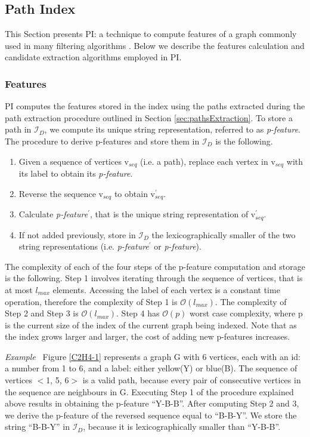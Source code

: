 \documentclass{l4proj}
\newcounter{example}[section]
\newenvironment{example}[1][]{\refstepcounter{example}\par\medskip
   \noindent \textit{Example~\theexample #1} \rmfamily}{\medskip}
\newcommand{\fancyI}{\mathcal{I}}
\begin{document}
\subsection{Path Index}
\label{sec:pi}
This Section presents PI: a technique to compute features of a graph commonly used in many filtering algorithms \cite{graphgrepsx}. Below we describe the features calculation and candidate extraction algorithms employed in PI.

\subsubsection{Features}
\label{sec:pifeatures}
PI computes the features stored in the index using the paths extracted during the path extraction procedure outlined in Section \ref{sec:pathsExtraction}. To store a path in $\fancyI_{D}$, we compute its unique string representation, referred to as \emph{p-feature}. The procedure to derive p-features and store them in $\fancyI_{D}$ is the following.
\begin{enumerate}
\item Given a sequence of vertices v$_{seq}$ (i.e. a path), replace each vertex in v$_{seq}$ with its label to obtain its \emph{p-feature}.
\item Reverse the sequence v$_{seq}$ to obtain v$_{seq}^{\prime}$.
\item Calculate \emph{p-feature}$^{\prime}$, that is the unique string representation of v$_{seq}^{\prime}$.
\item If not added previously, store in $\fancyI_{D}$ the lexicographically smaller of the two string representations (i.e. \emph{p-feature}$^{\prime}$ or \emph{p-feature}).
\end{enumerate}

The complexity of each of the four steps of the p-feature computation and storage is the following. Step 1 involves iterating through the sequence of vertices, that is at most $l_{max}$ elements. Accessing the label of each vertex is a constant time operation, therefore the complexity of Step 1 is $\mathcal{O}(l_{max})$. The complexity of Step 2 and Step 3 is $\mathcal{O}(l_{max})$. Step 4 has $\mathcal{O}(p)$ worst case complexity, where p is the current size of the index of the current graph being indexed. Note that as the index grows larger and larger, the cost of adding new p-features increases.

\begin{example}
Figure \ref{C2H4-1} represents a graph G with 6 vertices, each with an id: a number from 1 to 6, and a label: either yellow(Y) or blue(B). The sequence of vertices $<$1, 5, 6$>$ is a valid path, because every pair of consecutive vertices in the sequence are neighbours in G. Executing Step 1 of the procedure explained above results in obtaining the p-feature ``Y-B-B''. After computing Step 2 and 3, we derive the p-feature of the reversed sequence equal to ``B-B-Y''. We store the string ``B-B-Y'' in $\fancyI_{D}$, because it is lexicographically smaller than ``Y-B-B''.
\end{example}
\end{document}
